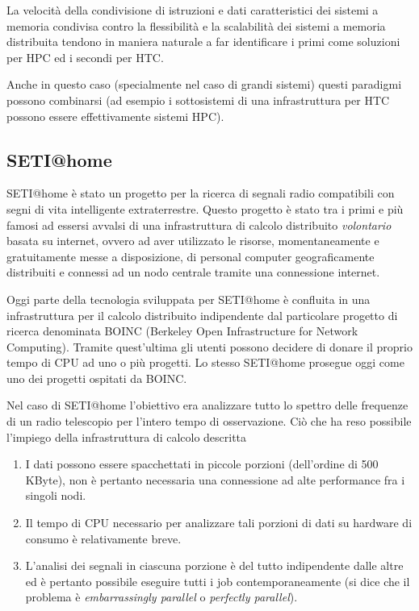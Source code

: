 \documentclass[italian,]{article}
\providecommand{\tightlist}{%
  \setlength{\itemsep}{0pt}\setlength{\parskip}{0pt}}
\begin{document}
La velocità della condivisione di istruzioni e dati caratteristici dei
sistemi a memoria condivisa contro la flessibilità e la scalabilità dei
sistemi a memoria distribuita tendono in maniera naturale a far
identificare i primi come soluzioni per HPC ed i secondi per HTC.

Anche in questo caso (specialmente nel caso di grandi sistemi) questi
paradigmi possono combinarsi (ad esempio i sottosistemi di una
infrastruttura per HTC possono essere effettivamente sistemi HPC).

\subsection{SETI@home}\label{setihome}

SETI@home è stato un progetto per la ricerca di segnali radio
compatibili con segni di vita intelligente extraterrestre. Questo
progetto è stato tra i primi e più famosi ad essersi avvalsi di una
infrastruttura di calcolo distribuito \emph{volontario} basata su
internet, ovvero ad aver utilizzato le risorse, momentaneamente e
gratuitamente messe a disposizione, di personal computer geograficamente
distribuiti e connessi ad un nodo centrale tramite una connessione
internet.

Oggi parte della tecnologia sviluppata per SETI@home è confluita in una
infrastruttura per il calcolo distribuito indipendente dal particolare
progetto di ricerca denominata BOINC (Berkeley Open Infrastructure for
Network Computing). Tramite quest'ultima gli utenti possono decidere di
donare il proprio tempo di CPU ad uno o più progetti. Lo stesso
SETI@home prosegue oggi come uno dei progetti ospitati da BOINC.

Nel caso di SETI@home l'obiettivo era analizzare tutto lo spettro delle
frequenze di un radio telescopio per l'intero tempo di osservazione. Ciò
che ha reso possibile l'impiego della infrastruttura di calcolo
descritta

\begin{enumerate}
\def\labelenumi{\arabic{enumi}.}
\tightlist
\item
  I dati possono essere spacchettati in piccole porzioni (dell'ordine di
  500 KByte), non è pertanto necessaria una connessione ad alte
  performance fra i singoli nodi.
\item
  Il tempo di CPU necessario per analizzare tali porzioni di dati su
  hardware di consumo è relativamente breve.
\item
  L'analisi dei segnali in ciascuna porzione è del tutto indipendente
  dalle altre ed è pertanto possibile eseguire tutti i job
  contemporaneamente (si dice che il problema è \emph{embarrassingly
  parallel} o \emph{perfectly parallel}).
\end{enumerate}
\end{document}
